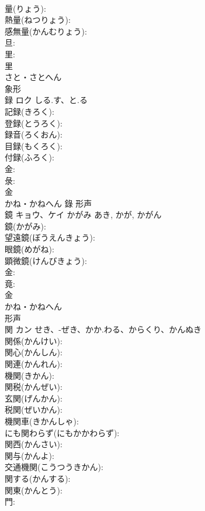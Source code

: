 \documentclass[8pt]{extreport}
\begin{document}
\begin{CJK}{UTF8}{min}
\\	量(りょう): 
\\	熱量(ねつりょう): 
\\	感無量(かんむりょう): 
\\	旦: 
\\	里: 
\\	里	
\\	さと・さとへん	
\\	象形 
\\	録	ロク	しる.す、と.る		
\\	記録(きろく): 
\\	登録(とうろく): 
\\	録音(ろくおん): 
\\	目録(もくろく): 
\\	付録(ふろく): 
\\	金: 
\\	彔: 
\\	金	
\\	かね・かねへん	錄	形声 
\\	鏡	キョウ、ケイ	かがみ	あき, かが, かがん	
\\	鏡(かがみ): 
\\	望遠鏡(ぼうえんきょう): 
\\	眼鏡(めがね): 
\\	顕微鏡(けんびきょう): 
\\	金: 
\\	竟: 
\\	金	
\\	かね・かねへん	
\\	形声 
\\	関	カン	せき、-ぜき、かか.わる、からくり、かんぬき		
\\	関係(かんけい): 
\\	関心(かんしん): 
\\	関連(かんれん): 
\\	機関(きかん): 
\\	関税(かんぜい): 
\\	玄関(げんかん): 
\\	税関(ぜいかん): 
\\	機関車(きかんしゃ): 
\\	にも関わらず(にもかかわらず): 
\\	関西(かんさい): 
\\	関与(かんよ): 
\\	交通機関(こうつうきかん): 
\\	関する(かんする): 
\\	関東(かんとう): 
\\	門: 

\end{CJK}
\end{document}
